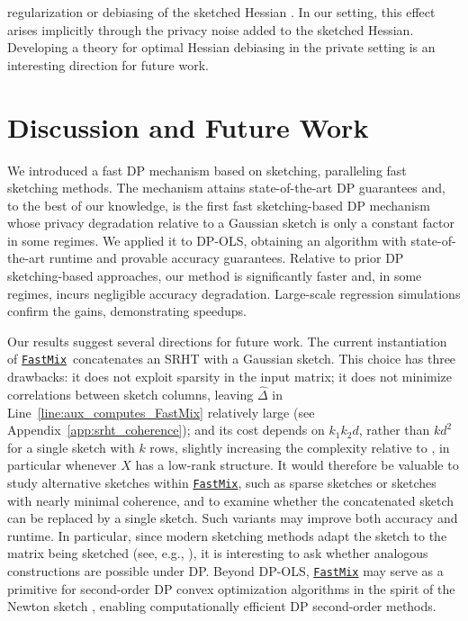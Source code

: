 \documentclass[11pt]{article}
\theoremstyle{definition}
\theoremstyle{plain}
\providecommand{\appendixref}[1]{Appendix~\ref{#1}}
\newcommand{\FastMix}{\hyperref[alg:fast_mixing]{\texttt{FastMix}}\xspace}
\begin{document}
regularization or debiasing of the sketched Hessian \citep{zhang2023optimal,derezinski2020debiasing}. In our setting, this effect arises implicitly through the privacy noise added to the sketched Hessian. Developing a theory for optimal Hessian debiasing in the private setting is an interesting direction for future work.
\section{Discussion and Future Work}
\label{s:discussion}
We introduced a fast DP mechanism based on sketching, paralleling fast sketching methods. The mechanism attains state-of-the-art DP guarantees and, to the best of our knowledge, is the first fast sketching-based DP mechanism whose privacy degradation relative to a Gaussian sketch is only a constant factor in some regimes. We applied it to DP-OLS, obtaining an algorithm with state-of-the-art runtime and provable accuracy guarantees. Relative to prior DP sketching-based approaches, our method is significantly faster and, in some regimes, incurs negligible accuracy degradation. Large-scale regression simulations confirm the gains, demonstrating speedups.

Our results suggest several directions for future work. The current instantiation of \FastMix\ concatenates an SRHT with a Gaussian sketch. This choice has three drawbacks: it does not exploit sparsity in the input matrix; it does not minimize correlations between sketch columns, leaving $\widehat{\Delta}$ in Line~\ref{line:aux_computes_FastMix} relatively large (see \appendixref{app:srht_coherence}); and its cost depends on $k_1k_2d$, rather than $kd^2$ for a single sketch with $k$ rows, slightly increasing the complexity relative to \citet[Section.~III.A]{pilanci2015randomized}, in particular whenever $X$ has a low-rank structure. It would therefore be valuable to study alternative sketches within \FastMix, such as sparse sketches or sketches with nearly minimal coherence, and to examine whether the concatenated sketch can be replaced by a single sketch. Such variants may improve both accuracy and runtime. In particular, since modern sketching methods adapt the sketch to the matrix being sketched (see, e.g., \citep{derezinski2021newton}), it is interesting to ask whether analogous constructions are possible under DP. Beyond DP-OLS, \FastMix may serve as a primitive for second-order DP convex optimization algorithms in the spirit of the Newton sketch \citep{pilanci2017newton}, enabling computationally efficient DP second-order methods. %
\end{document}
